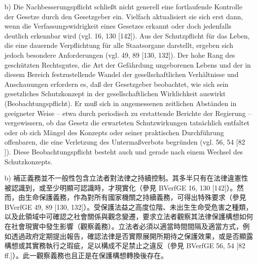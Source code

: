 \documentclass[12pt]{article}
\begin{document}
\begin{sourcepara}[title={原文E.190}]
b) Die Nachbesserungspflicht schließt nicht generell eine fortlaufende Kontrolle der Gesetze durch den Gesetzgeber ein. Vielfach aktualisiert sie sich erst dann, wenn die Verfassungswidrigkeit eines Gesetzes erkannt oder doch jedenfalls deutlich erkennbar wird (vgl. \abbrBVerfGE{} 16, 130 [142]). Aus der Schutzpflicht für das Leben, die eine dauernde Verpflichtung für alle Staatsorgane darstellt, ergeben sich jedoch besondere Anforderungen (vgl. \abbrBVerfGE{} 49, 89 [130, 132]). Der hohe Rang des geschützten Rechtsgutes, die Art der Gefährdung ungeborenen Lebens und der in diesem Bereich festzustellende Wandel der gesellschaftlichen Verhältnisse und Anschauungen erfordern es, daß der Gesetzgeber beobachtet, wie sich sein gesetzliches Schutzkonzept in der gesellschaftlichen Wirklichkeit auswirkt (Beobachtungspflicht). Er muß sich in angemessenen zeitlichen Abständen in geeigneter Weise -- etwa durch periodisch zu erstattende Berichte der Regierung -- vergewissern, ob das Gesetz die erwarteten Schutzwirkungen tatsächlich entfaltet oder ob sich Mängel des Konzepts oder seiner praktischen Durchführung offenbaren, die eine Verletzung des Untermaßverbots begründen (vgl. \abbrBVerfGE{} 56, 54 [82 \abbrFF{}]). Diese Beobachtungspflicht besteht auch und gerade nach einem Wechsel des Schutzkonzepts.
\end{sourcepara}
\begin{transpara}
b) 補正義務並不一般性包含立法者對法律之持續控制。其多半只有在法律違憲性被認識到，或至少明顯可認識時，才現實化（參見 BVerfGE 16, 130 [142]）。然而，由生命保護義務，作為對所有國家機關之持續義務，可得出特殊要求（參見 BVerfGE 49, 89 [130, 132]）。受保護法益之高度位階、未出生生命受危害之種類，以及此領域中可確認之社會關係與觀念變遷，要求立法者觀察其法律保護構想如何在社會現實中發生影響（觀察義務）。立法者必須以適當時間間隔及適當方式，例如透過政府定期提出報告，確認法律是否實際展開所期待之保護效果，或是否顯露構想或其實務執行之瑕疵，足以構成不足禁止之違反（參見 BVerfGE 56, 54 [82 ff.]）。此一觀察義務也且正是在保護構想轉換後存在。
\end{transpara}
\end{document}
